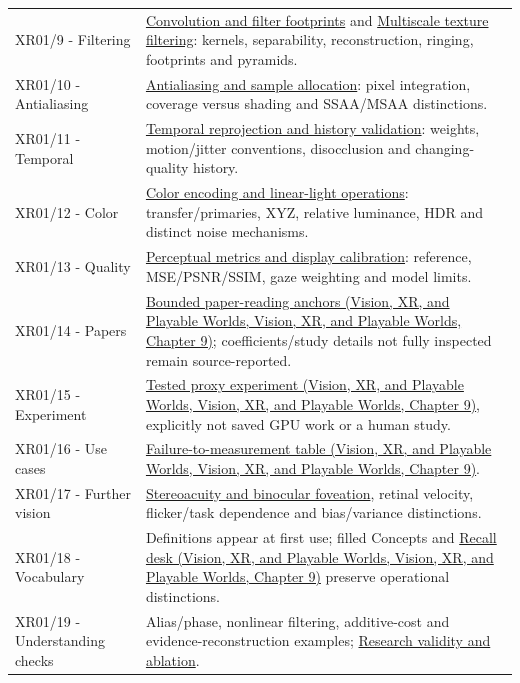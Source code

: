 {\begin{longtable}[]{@{}
  >{\raggedright\arraybackslash}p{}
  >{\raggedright\arraybackslash}p{}@{}}
XR01/9 - Filtering & \hyperref[appendix-d5b3c692d9f0]{Convolution and filter footprints} and \hyperref[appendix-b677a85ba76f]{Multiscale texture filtering}: kernels, separability, reconstruction, ringing, footprints and pyramids. \\
XR01/10 - Antialiasing & \hyperref[appendix-4192b2bdd21e]{Antialiasing and sample allocation}: pixel integration, coverage versus shading and SSAA/MSAA distinctions. \\
XR01/11 - Temporal & \hyperref[appendix-0727340a4428]{Temporal reprojection and history validation}: weights, motion/jitter conventions, disocclusion and changing-quality history. \\
XR01/12 - Color & \hyperref[appendix-a9f83ad40792]{Color encoding and linear-light operations}: transfer/primaries, XYZ, relative luminance, HDR and distinct noise mechanisms. \\
XR01/13 - Quality & \hyperref[appendix-b2c1846508bf]{Perceptual metrics and display calibration}: reference, MSE/PSNR/SSIM, gaze weighting and model limits. \\
XR01/14 - Papers & \href{../07-Vision-XR-and-Playable-Worlds/main.pdf\#nameddest=04-visual-computing-ii-ch042-read-research-as-a-chain-of-questions-methods-and-bounded-conclusions}{Bounded paper-reading anchors (Vision, XR, and Playable Worlds, Vision, XR, and Playable Worlds, Chapter 9)}; coefficients/study details not fully inspected remain source-reported. \\
XR01/15 - Experiment & \href{../07-Vision-XR-and-Playable-Worlds/main.pdf\#nameddest=04-visual-computing-ii-ch042-complete-numerical-and-image-space-laboratory}{Tested proxy experiment (Vision, XR, and Playable Worlds, Vision, XR, and Playable Worlds, Chapter 9)}, explicitly not saved GPU work or a human study. \\
XR01/16 - Use cases & \href{../07-Vision-XR-and-Playable-Worlds/main.pdf\#nameddest=04-visual-computing-ii-ch042-diagnose-a-symptom-by-the-quantity-that-failed}{Failure-to-measurement table (Vision, XR, and Playable Worlds, Vision, XR, and Playable Worlds, Chapter 9)}. \\
XR01/17 - Further vision & \hyperref[appendix-8dc848f14052]{Stereoacuity and binocular foveation}, retinal velocity, flicker/task dependence and bias/variance distinctions. \\
XR01/18 - Vocabulary & Definitions appear at first use; filled Concepts and \href{../07-Vision-XR-and-Playable-Worlds/main.pdf\#nameddest=04-visual-computing-ii-ch042-teach-the-distinctions-from-a-blank-board}{Recall desk (Vision, XR, and Playable Worlds, Vision, XR, and Playable Worlds, Chapter 9)} preserve operational distinctions. \\
XR01/19 - Understanding checks & Alias/phase, nonlinear filtering, additive-cost and evidence-reconstruction examples; \hyperref[appendix-65788587ef78]{Research validity and ablation}. \\
\end{longtable}
}

